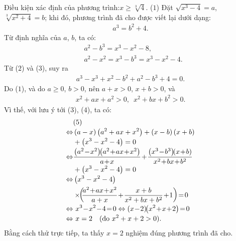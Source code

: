 \begin{multicols}{2}
	\vskip 0.05cm
	Điều kiện xác định của phương trình:\linebreak $x \ge \sqrt[3]{4}$. \hfill ($1$)
	\vskip 0.05cm
	Đặt $\sqrt {{x^3} - 4}  = a$,   $\sqrt[3]{{{x^2} + 4}} = b$; khi đó, phương trình đã cho được viết lại dưới dạng:
	\begin{align*}
		{a^3} = {b^2} + 4. \tag{$2$}
	\end{align*}
	Từ định nghĩa của $a$, $b$, ta có:
	\begin{align*}
		&{a^2} - {b^3} = {x^3} - {x^2} - 8, \tag{$3$}\\
		&{a^2} - {x^2} = {x^3} - {b^3} = {x^3} - {x^2} - 4.\tag{$4$}
	\end{align*}
	Từ ($2$) và ($3$), suy ra
	\begin{align*}
		{a^3} - {x^3} + {x^2} - {b^2} + {a^2} - {b^3} + 4 = 0. \tag{$5$}
	\end{align*}
	Do ($1$), và do $a \ge 0$, $b > 0$, nên $a + x > 0$, $x + b > 0$, và
	\begin{align*}
		{x^2} + ax + {a^2} > 0,\,\,\, {x^2} + bx + {b^2} > 0.
	\end{align*}
	Vì thế, với lưu ý tới ($3$), ($4$), ta có:
	\begin{align*}
		&(5) \\[-0.5ex]
		\Leftrightarrow &\left( {a - x} \right)\left( {{a^2} + ax + {x^2}} \right) + \left( {x - b} \right)\left( {x + b} \right) \\[-0.5ex]
		&+ \left( {{x^3} - {x^2} - 4} \right) = 0\\[-0.5ex]
		\Leftrightarrow &\dfrac{{\left( {{a^2} \!-\! {x^2}} \right)\!\!\left( {{a^2} \!+\! ax \!+\! {x^2}} \right)}}{{a \!+\! x}} \!+\! \dfrac{{\left( {{x^3} \!-\! {b^3}} \right)\!\!\left( {x \!+\! b} \right)}}{{{x^2} \!+\! bx \!+\! {b^2}}} \\[-0.5ex]
		&+ \left( {{x^3} - {x^2} - 4} \right) = 0\\[-0.5ex]
		\Leftrightarrow &\left( {{x^3} - {x^2} - 4} \right)\\
		&\times\!\!\left(\!\! {\dfrac{{{a^2} \!+\! ax \!+\! {x^2}}}{{a + x}} \!+\! \dfrac{{x + b}}{{{x^2} + bx + {b^2}}} \!+\! 1} \right) \!=\! 0\\[-0.5ex]
		\Leftrightarrow &\,\,{x^3} \!-\! {x^2} \!-\! 4 \!=\! 0 \Leftrightarrow  \left( {x \!-\! 2} \right)\!\!\left( {{x^2} \!+\! x \!+\! 2} \right) \!=\! 0\\[-0.5ex]
		\Leftrightarrow &\,\,x = 2 \quad(\text{\color{black}do } x^2 + x + 2 > 0).
	\end{align*}
	Bằng cách thử trực tiếp, ta thấy $x = 2$ nghiệm đúng phương trình đã cho.

\end{multicols}
